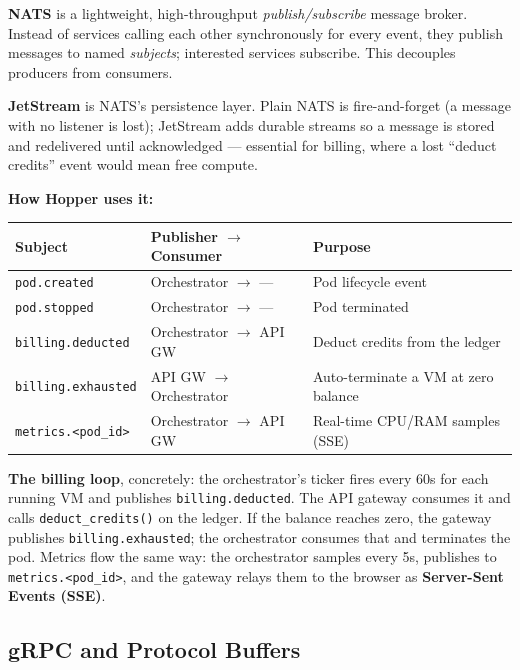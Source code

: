 \documentclass[11pt,a4paper]{article}
\newcommand{\code}[1]{\texttt{\small #1}}
\begin{document}
\textbf{NATS} is a lightweight, high-throughput \emph{publish/subscribe} message
broker. Instead of services calling each other synchronously for every event,
they publish messages to named \emph{subjects}; interested services subscribe.
This decouples producers from consumers.

\textbf{JetStream} is NATS's persistence layer. Plain NATS is fire-and-forget (a
message with no listener is lost); JetStream adds durable streams so a message is
stored and redelivered until acknowledged --- essential for billing, where a lost
``deduct credits'' event would mean free compute.

\noindent
\textbf{How Hopper uses it:}

\begin{center}
\begin{tabular}{@{}llp{6.3cm}@{}}
\toprule
\textbf{Subject} & \textbf{Publisher $\rightarrow$ Consumer} & \textbf{Purpose} \\
\midrule
\code{pod.created}       & Orchestrator $\rightarrow$ --- & Pod lifecycle event \\
\code{pod.stopped}       & Orchestrator $\rightarrow$ --- & Pod terminated \\
\code{billing.deducted}  & Orchestrator $\rightarrow$ API GW & Deduct credits from the ledger \\
\code{billing.exhausted} & API GW $\rightarrow$ Orchestrator & Auto-terminate a VM at zero balance \\
\code{metrics.<pod\_id>} & Orchestrator $\rightarrow$ API GW & Real-time CPU/RAM samples (SSE) \\
\bottomrule
\end{tabular}
\end{center}

\noindent
\textbf{The billing loop}, concretely: the orchestrator's ticker fires every 60s
for each running VM and publishes \code{billing.deducted}. The API gateway
consumes it and calls \code{deduct\_credits()} on the ledger. If the balance
reaches zero, the gateway publishes \code{billing.exhausted}; the orchestrator
consumes that and terminates the pod. Metrics flow the same way: the orchestrator
samples every 5s, publishes to \code{metrics.<pod\_id>}, and the gateway relays
them to the browser as \textbf{Server-Sent Events (SSE)}.

\subsection{gRPC and Protocol Buffers}
\end{document}
